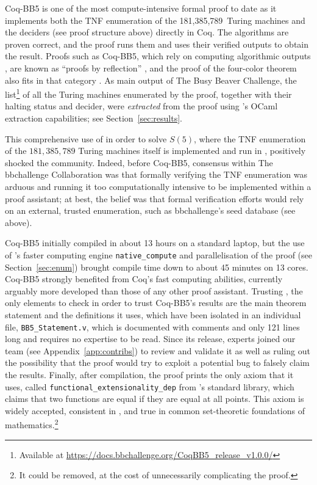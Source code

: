 \documentclass[a4paper,british]{article}
\theoremstyle{definition} %
\numberwithin{equation}{section}
\theoremstyle{definition} %
\newcommand{\BBtheFifthTNF}{181{,}385{,}789}
\newcommand{\CoqBB}{Coq-BB5\xspace}
\begin{document}
\CoqBB is one of the most compute-intensive formal proof to date as it implements both the TNF enumeration of the \BBtheFifthTNF\ Turing machines and the deciders (see proof structure above) directly in Coq. The algorithms are proven correct, and the proof runs them and uses their verified outputs to obtain the result. Proofs such as \CoqBB, which rely on computing algorithmic outputs \cite{vmcompute,nativecompute}, are known as ``proofs by reflection'' \cite{boutin1997using}, and the \Coq proof of the four-color theorem also fits in that category \cite{gonthier2010introduction}. As main output of The Busy Beaver Challenge, the list\footnote{Available at \url{https://docs.bbchallenge.org/CoqBB5_release_v1.0.0/}} of all the Turing machines enumerated by the \Coq proof, together with their halting status and decider, were \textit{extracted} from the proof using \Coq's OCaml extraction capabilities; see Section~\ref{sec:results}.

This comprehensive use of \Coq in order to solve $S(5)$, where the TNF enumeration of the $\BBtheFifthTNF$ Turing machines itself is implemented and run in \Coq, positively shocked the community. Indeed, before \CoqBB, consensus within The bbchallenge Collaboration  was that formally verifying the TNF enumeration was arduous and running it too computationally intensive to be implemented within a proof assistant; at best, the belief was that formal verification efforts would rely on an external, trusted enumeration, such as bbchallenge's seed database (see above).




\enlargethispage{\baselineskip}
\CoqBB initially compiled in about 13 hours on a standard laptop, but the use of \Coq's faster computing engine \texttt{native\_compute} \cite{nativecompute} and parallelisation of the proof (see Section~\ref{sec:enum}) brought compile time down to about 45 minutes on 13 cores. \CoqBB strongly benefited from Coq’s fast computing abilities, currently arguably more developed than those of any other proof assistant. Trusting \Coq, the only elements to check in order to trust \CoqBB's results are the main theorem statement and the definitions it uses, which have been isolated in an individual file, \texttt{BB5\_Statement.v}, which is documented with comments and only 121 lines long and requires no \Coq expertise to be read. Since its release, \Coq experts joined our team (see Appendix~\ref{app:contribs}) to review and validate it as well as ruling out the possibility that the proof would try to exploit a potential \Coq bug to falsely claim the results. Finally, after compilation, the proof prints the only axiom that it uses, called \texttt{functional\_extensionality\_dep} from \Coq's standard library, which claims that two functions are equal if they are equal at all points. This axiom is widely accepted, consistent in \Coq, and true in common set-theoretic foundations of mathematics.\footnote{It could be removed, at the cost of unnecessarily complicating the proof.}
\end{document}
